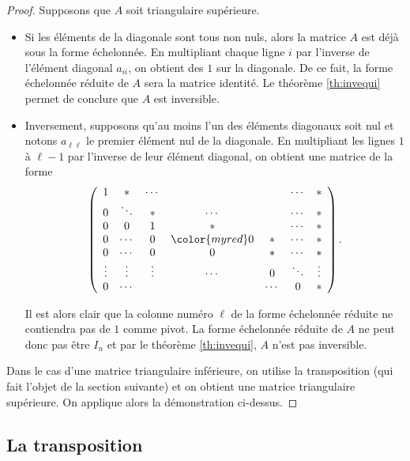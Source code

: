 \documentclass[class=report,crop=false]{standalone}
\begin{document}
\begin{proof}
Supposons que $A$ soit triangulaire supérieure.

\begin{itemize}
  \item Si les éléments de la diagonale sont tous non nuls, alors
  la matrice $A$ est déjà sous la forme échelonnée.
En multipliant chaque ligne $i$ par l'inverse de l'élément diagonal $a_{ii}$,
on obtient des $1$ sur la diagonale.
De ce fait, la forme échelonnée réduite de $A$ sera la matrice identité.
Le théorème \ref{th:invequi} permet de conclure que $A$ est inversible.

  \item Inversement, supposons qu'au moins l'un des éléments diagonaux soit nul et notons $a_{\ell\ell}$
le premier élément nul de la diagonale. En multipliant les lignes $1$ à
$\ell-1$ par l'inverse de leur élément diagonal, on obtient une matrice de la forme
\[\left( \begin{array}{ccccccc}
1 & * & \cdots &&& \cdots& * \\
0& \ddots  & * &\cdots &&\cdots & * \\
0 & 0 & 1 & * && \cdots &* \\
0 & \cdots & 0 & {\color{myred}0} &*&\cdots &*\\
0 & \cdots & 0& 0& * & \cdots &*  \\
\vdots & \vdots & \vdots & \cdots &0&\ddots & \vdots \\
0& \cdots &&&\cdots&0&*
\end{array}\right).\]


Il est alors clair que la colonne numéro $\ell$ de la forme échelonnée réduite ne
contiendra pas de $1$ comme pivot. La forme échelonnée réduite de $A$
ne peut donc pas être $I_n$ et par le théorème \ref{th:invequi},
$A$ n'est pas inversible.
\end{itemize}

Dans le cas d'une matrice triangulaire inférieure, on utilise
la transposition (qui fait l'objet de la section suivante) et on
obtient une matrice triangulaire supérieure. On applique alors
la démonstration ci-dessus.
\end{proof}



\subsection{La transposition}
\end{document}
